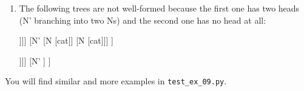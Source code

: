 \begin{enumerate}[label=\textbullet]
	\item The following trees are not well-formed because the first one has two heads (N' branching into two Ns) and the second one has no head at all:\\[\baselineskip]
	\begin{forest}
	[NP
		[DP [D' [D [the]]]]
		[N' [N [cat]] [N [cat]]]
	]
	\end{forest}
	\hspace{1cm}
	\begin{forest}
	[NP
		[DP [D' [D [the]]]]
		[N' ]
	]
	\end{forest}
	\vspace{.25\baselineskip}
	
\end{enumerate}
\vspace{.5\baselineskip}
You will find similar and more examples in \texttt{test\_ex\_09.py}.\\ \\



